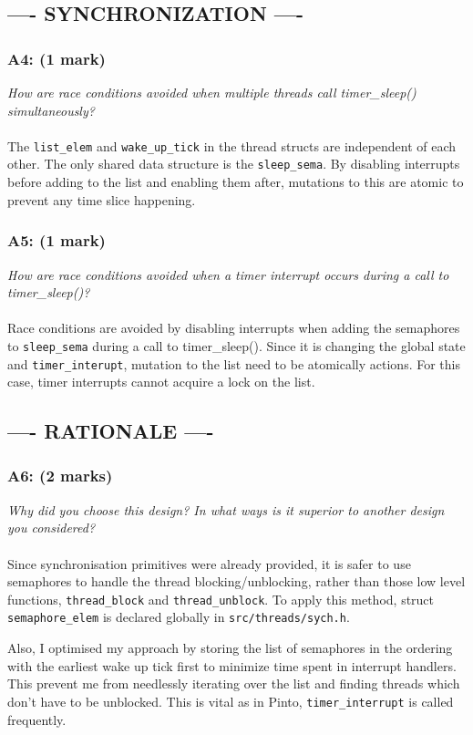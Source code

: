 \documentclass{article}
\begin{document}
\subsection*{---- SYNCHRONIZATION ----}

\subsubsection*{A4: (1 mark) }
\textit{How are race conditions avoided when multiple threads call timer\_sleep() simultaneously?}
\\ \\
The \texttt{list\_elem} and \texttt{wake\_up\_tick} in the thread structs are independent of each other. The only shared data structure is the \texttt{sleep\_sema}. By disabling interrupts before adding to the list and enabling them after, mutations to this are atomic to prevent any time slice happening.

\subsubsection*{A5: (1 mark) }
\textit{How are race conditions avoided when a timer interrupt occurs during a call to timer\_sleep()?}
\\ \\
Race conditions are avoided by disabling interrupts when adding the semaphores to \texttt{sleep\_sema} during a call to timer\_sleep(). Since it is changing the global state and \texttt{timer\_interupt},  mutation to the list need to be  atomically actions. For this case, timer interrupts cannot acquire a lock on the list.

\subsection*{---- RATIONALE ----}

\subsubsection*{A6: (2 marks) }
\textit{Why did you choose this design? In what ways is it superior to another design you considered?}
\\ \\
Since synchronisation primitives were already provided, it is safer to use semaphores to handle the thread blocking/unblocking, rather than those low level functions, \texttt{thread\_block} and \texttt{thread\_unblock}. To apply this method, struct \texttt{semaphore\_elem} is declared globally in \texttt{src/threads/sych.h}.
\par
Also, I optimised my approach by storing the list of semaphores in the ordering with the earliest wake up tick first to minimize time spent in interrupt handlers. This prevent me from needlessly iterating over the list and finding threads which don’t have to be unblocked. This is vital as in Pinto, \texttt{timer\_interrupt} is called frequently.
\end{document}
